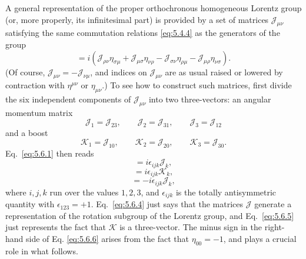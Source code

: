 A general representation of the proper orthochronous homogeneous Lorentz group
(or, more properly, its infinitesimal part) is provided by a set of matrices
$\mathcal{J}_{\mu\nu}$ satisfying the same commutation relations \eqref{eq:5.4.4} as the
generators of the group
\begin{equation}
[\mathcal{J}_{\mu\nu},\mathcal{J}_{\rho\sigma}]
=i(\mathcal{J}_{\rho\nu}\eta_{\sigma\mu}
+\mathcal{J}_{\mu\sigma}\eta_{\nu\rho}
-\mathcal{J}_{\sigma\nu}\eta_{\rho\mu}
-\mathcal{J}_{\mu\rho}\eta_{\nu\sigma}).
\tag{5.6.1}\label{eq:5.6.1}
\end{equation}
(Of course, $\mathcal{J}_{\mu\nu}=-\mathcal{J}_{\nu\mu}$, and indices on
$\mathcal{J}_{\mu\nu}$ are as usual raised or lowered by contraction with
$\eta^{\mu\nu}$ or $\eta_{\mu\nu}$.) To see how to construct such matrices,
first divide the six independent components of $\mathcal{J}_{\mu\nu}$ into two
three-vectors: an angular momentum matrix
\begin{equation}
\mathcal{J}_1=\mathcal{J}_{23},\qquad
\mathcal{J}_2=\mathcal{J}_{31},\qquad
\mathcal{J}_3=\mathcal{J}_{12}
\tag{5.6.2}\label{eq:5.6.2}
\end{equation}
and a boost
\begin{equation}
\mathcal{K}_1=\mathcal{J}_{10},\qquad
\mathcal{K}_2=\mathcal{J}_{20},\qquad
\mathcal{K}_3=\mathcal{J}_{30}.
\tag{5.6.3}\label{eq:5.6.3}
\end{equation}
Eq.~\eqref{eq:5.6.1} then reads
\begin{equation}
[\mathcal{J}_i,\mathcal{J}_j]=i\epsilon_{ijk}\mathcal{J}_k,
\tag{5.6.4}\label{eq:5.6.4}
\end{equation}
\begin{equation}
[\mathcal{J}_i,\mathcal{K}_j]=i\epsilon_{ijk}\mathcal{K}_k,
\tag{5.6.5}\label{eq:5.6.5}
\end{equation}
\begin{equation}
[\mathcal{K}_i,\mathcal{K}_j]=-i\epsilon_{ijk}\mathcal{J}_k,
\tag{5.6.6}\label{eq:5.6.6}
\end{equation}
where $i,j,k$ run over the values $1,2,3$, and $\epsilon_{ijk}$ is the totally
antisymmetric quantity with $\epsilon_{123}=+1$. Eq.~\eqref{eq:5.6.4} just says that
the matrices $\mathcal{J}$ generate a representation of the rotation subgroup
of the Lorentz group, and Eq.~\eqref{eq:5.6.5} just represents the fact that
$\mathcal{K}$ is a three-vector. The minus sign in the right-hand side of Eq.
\eqref{eq:5.6.6} arises from the fact that $\eta_{00}=-1$, and plays a crucial role in
what follows.

